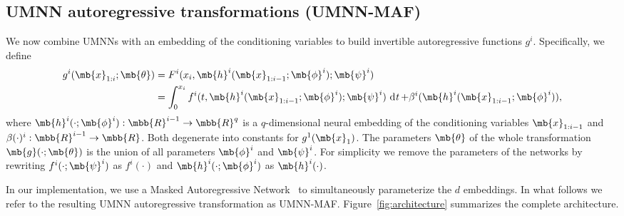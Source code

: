 \subsection{UMNN autoregressive transformations (UMNN-MAF)} \label{sec:UMNN-MAF}

We now combine UMNNs with an embedding of the conditioning variables to build invertible autoregressive functions $g^i$. Specifically, we define
\begin{align}
    g^i(\mb{x}_{1 : i}; \mb{\theta}) &= F^i(x_i, \mb{h}^i(\mb{x}_{1 : i-1}; \mb{\phi}^i); \mb{\psi}^i)\nonumber\\
    &= \int^{x_i}_0 f^i(t, \mb{h}^i(\mb{x}_{1 : i-1}; \mb{\phi}^i); \mb{\psi}^i) \dt + \beta^i(\mb{h}^i(\mb{x}_{1 : i-1}; \mb{\phi}^i)),\label{eq:umnn}
\end{align}
where $\mb{h}^i(\cdot; \mb{\phi}^i): \mbb{R}^{i-1} \rightarrow \mbb{R}^{q}$ is a $q$-dimensional neural embedding of the conditioning variables $\mb{x}_{1:i-1}$ and $\beta(\cdot)^i: \mbb{R}^{i-1} \rightarrow \mbb{R}$. Both degenerate into constants for $g^1(\mb{x}_{1})$. The parameters $\mb{\theta}$ of the whole transformation $\mb{g}(\cdot; \mb{\theta})$ is the union of all parameters $\mb{\phi}^i$ and $\mb{\psi}^i$.
For simplicity we remove the parameters of the networks by rewriting $f^i(\cdot; \mb{\psi}^i)$ as $f^i(\cdot)$ and $\mb{h}^i(\cdot; \mb{\phi}^i)$ as $\mb{h}^i(\cdot)$.

In our implementation, we use a Masked Autoregressive Network~\citep{germain_made_2015, kingma_improved_2016, papamakarios_masked_2017} to simultaneously parameterize the $d$ embeddings. In what follows we refer to the resulting UMNN autoregressive transformation as UMNN-MAF.
Figure~\ref{fig:architecture} summarizes the complete architecture.

